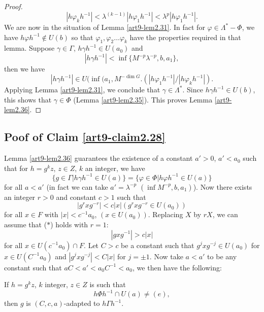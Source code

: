\begin{proof}
$$
|h \varphi_k h^{-1}| < \lambda^{(k-1)} |h \varphi_1 h^{-1}| < \lambda^p |h \varphi_1 h^{-1}|.
$$
We are now in the situation of Lemma \ref{art9-lem2.31}. In fact for $\varphi \in \Lambda^\ast - \Phi$, we have $h \varphi h^{-1} \not\in U (b)$ so that $\varphi_1, \varphi_2 \ldots \varphi_k$ have the properties required in that lemma. Suppose $\gamma \in \Gamma$, $h \gamma h^{-1} \in U (a_0)$  and
$$
|h \gamma h^{-1}| < \inf \{ M^{-p} \lambda^{-p}, b, a_1\},
$$
then we have 
$$
|h \gamma h^{-1}| \in U (\inf (a_1, M^{-\dim G}. (|h \varphi_1 h^{-1}| / |h\varphi_k h^{-1}|).
$$
Applying Lemma \ref{art9-lem2.31}, we conclude that $\gamma \in \Lambda^\ast$. Since $h \gamma h^{-1} \in U (b)$, this shows that $\gamma \in \Phi$ (Lemma \ref{art9-lem2.35}). This proves Lemma \ref{art9-lem2.36}.
\end{proof}

\setcounter{subsection}{36}
\subsection{Poof of Claim \protect\ref{art9-claim2.28}}\label{art9-subsec2.37}
 Lemma \ref{art9-lem2.36} guarantees the existence of a constant $a'> 0$, $a' < a_0$ such that for $h = g^kz$, $z \in Z$, $k$ an integer, we have
$$
\{g \in \Gamma \big| h \gamma h^{-1} \in U (a)\} = \{\varphi \in \Phi \big| h \varphi h^{-1} \in U (a)\}
$$
for all $a< a'$ (in fact we can take $a' = \lambda^{-p}$ $(\inf M^{-p}, b, a_1)$). Now there exists an integer $r >0$ and constant $c >1$ such that
\begin{equation*}
|g^r x g^{-r}| < c |x| (g^r x g^{-r} \in U (a_0)) 
\tag*{($\ast$)}
\end{equation*}
for all $x \in F$ with $|x| < c^{-1} a_0$, $(x \in U (a_0))$. Replacing $X$ by $rX$, we can assume that ($\ast$) holds with $r = 1$:
\begin{equation*}
|gx g^{-1}| > c|x| \tag*{($\ast\ast$)}
\end{equation*}
for all $x \in U (c^{-1} a_0) \cap F$. Let $C > c$ be a constant such that $g^j x g^{-j} \in U (a_0)$ for $x \in U (C^{-1} a_0)$ and $|g^j x g^{-j}| < C|x|$ for $j =\pm 1$. Now take $a < a'$ to be any constant such that $a C < a' < a_0 C^{-1} < a_0$, we then have the following:

\setcounter{assertion}{37}
\begin{assertion}\label{art9-asser2.38}
If $h = g^kz$, $k$ integer, $z \in Z$ is such that 
$$
h \Phi h^{-1} \cap U (a) \neq (e),
$$
then $g$ is $(C, c, a)$-adapted to $h \Gamma h^{-1}$.
\end{assertion}

